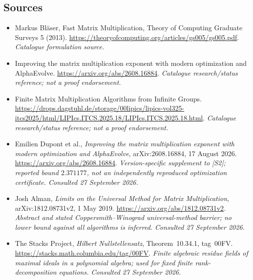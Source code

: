 \documentclass[11pt,a4paper]{article}
\numberwithin{equation}{section}
\begin{document}
\subsection{Sources}
\begin{itemize}\raggedright
\item[\textnormal{[S1]}]\hypertarget{source:26:1}{} Markus Bläser, Fast Matrix Multiplication, Theory of Computing Graduate Surveys 5 (2013).
\url{https://theoryofcomputing.org/articles/gs005/gs005.pdf}.
{\small\textit{Catalogue formulation source.}}
\item[\textnormal{[S2]}]\hypertarget{source:26:2}{} Improving the matrix multiplication exponent with modern optimization and AlphaEvolve.
\url{https://arxiv.org/abs/2608.16884}.
{\small\textit{Catalogue research/status reference; not a proof endorsement.}}
\item[\textnormal{[S3]}]\hypertarget{source:26:3}{} Finite Matrix Multiplication Algorithms from Infinite Groups.
\url{https://drops.dagstuhl.de/storage/00lipics/lipics-vol325-itcs2025/html/LIPIcs.ITCS.2025.18/LIPIcs.ITCS.2025.18.html}.
{\small\textit{Catalogue research/status reference; not a proof endorsement.}}
\item[\textnormal{[E1]}]\hypertarget{extra:26:1}{} Emilien Dupont et al.,
\emph{Improving the matrix multiplication exponent with modern optimization
and AlphaEvolve}, arXiv:2608.16884, 17 August 2026.
\url{https://arxiv.org/abs/2608.16884}.
{\small\textit{Version-specific supplement to [S2]; reported bound
$2.371177$, not an independently reproduced optimization certificate.
Consulted 27 September 2026.}}
\item[\textnormal{[E2]}]\hypertarget{extra:26:2}{} Josh Alman,
\emph{Limits on the Universal Method for Matrix Multiplication},
arXiv:1812.08731v2, 1 May 2019.
\url{https://arxiv.org/abs/1812.08731v2}.
{\small\textit{Abstract and stated Coppersmith--Winograd universal-method
barrier; no lower bound against all algorithms is inferred.
Consulted 27 September 2026.}}
\item[\textnormal{[E3]}]\hypertarget{extra:26:3}{} The Stacks Project,
\emph{Hilbert Nullstellensatz}, Theorem~10.34.1, tag~00FV.
\url{https://stacks.math.columbia.edu/tag/00FV}.
{\small\textit{Finite algebraic residue fields of maximal ideals in a
polynomial algebra; used for fixed finite rank-decomposition equations.
Consulted 27 September 2026.}}

\end{itemize}

\end{document}
